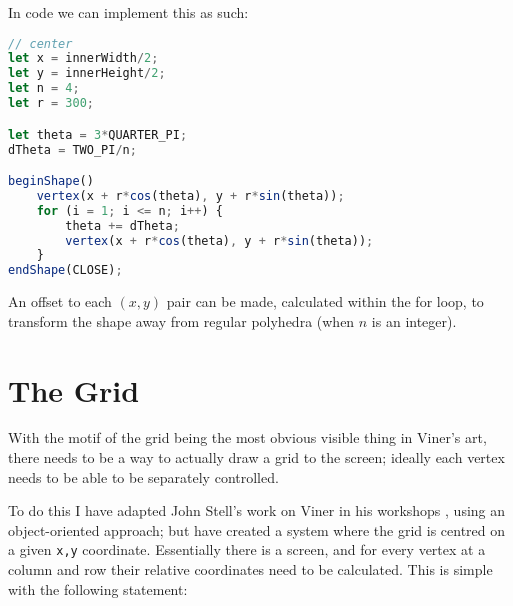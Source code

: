 In code we can implement this as such:
\begin{lstlisting}[language=JavaScript]
// center
let x = innerWidth/2;
let y = innerHeight/2;
let n = 4;
let r = 300;

let theta = 3*QUARTER_PI;
dTheta = TWO_PI/n;

beginShape()
    vertex(x + r*cos(theta), y + r*sin(theta));
    for (i = 1; i <= n; i++) {
        theta += dTheta;
        vertex(x + r*cos(theta), y + r*sin(theta));
    }
endShape(CLOSE);
\end{lstlisting}

An offset to each $(x,y)$ pair can be made, calculated within the for loop, to
transform the shape away from regular polyhedra (when $n$ is an integer).

\section{The Grid}
With the motif of the grid being the most obvious visible thing in Viner's art,
there needs to be a way to actually draw a grid to the screen; ideally each
vertex needs to be able to be separately controlled.

To do this I have adapted John Stell's work on Viner in his workshops
\cite{stell_unpublished}, using an object-oriented approach; but have created a
system where the grid is centred on a given \verb|x,y| coordinate. Essentially
there is a screen, and for every vertex at a column and row their relative
coordinates need to be calculated. This is simple with the following statement:


%
%

%

